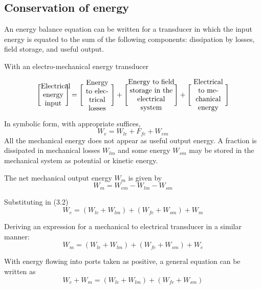 \documentclass[a4paper,numbers=noenddot,12pt]{scrbook}
\begin{document}
\subsection{Conservation of energy}
An energy balance equation can be written for a transducer in which the input energy is equated to the sum of the following components: dissipation by losses, field storage, and useful output.

With an electro-mechanical energy transducer

\begin{equation}
    \Bigg[
        \parbox{8ex}{\centering Electrical energy input}
    \Bigg]
    =
    \Bigg[
        \parbox{9ex}{\centering Energy to electrical losses}
    \Bigg]
    +
    \Bigg[
        \parbox{15ex}{\centering Energy to field storage in the electrical system}
    \Bigg]
    +
    \Bigg[
        \parbox{11ex}{\centering Electrical to mechanical energy}
    \Bigg]
    \label{eq:Eq3.1}
\end{equation}

In symbolic form, with appropriate suffices,
\begin{equation}
    W_e = W_{le} + F_{fe} +W_{em}
    \label{eq:Eq3.2}
\end{equation}
All the mechanical energy does not appear as useful output energy. A fraction is dissipated in mechanical losses $W_{lm}$ and some energy $W_{sm}$ may be stored in the mechanical system as potential or kinetic energy.

The net mechanical output energy $W_m$ is given by
\begin{equation}
    W_m = W_{em} - W_{lm} -W_{sm}
    \label{eq:Eq3.3}
\end{equation}

Substituting in (3.2)
\begin{equation}
    W_e = (W_{le} + W_{lm}) + (W_{fe} + W_{sm}) + W_m
    \label{eq:Eq.3-4}
\end{equation}

Deriving an expression for a mechanical to electrical transducer in a similar manner:
\begin{equation}
    W_m = (W_{le} + W_{lm}) + (W_{fe} + W_{sm}) + W_e 
    \label{eq:Eq3.5}
\end{equation}

With energy flowing into ports taken as positive, a general equation can be written as
\begin{equation}
    W_e + W_m = (W_{le}+ W_{lm}) + (W_{fe} + W_{sm})
    \label{eq_Eq3.6}
\end{equation}
\end{document}
